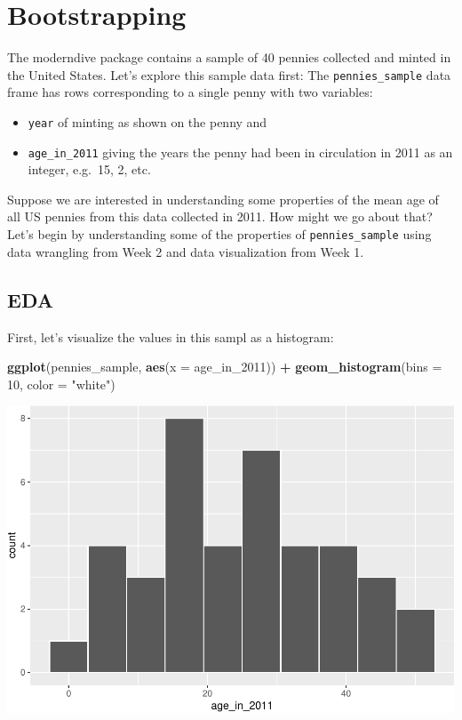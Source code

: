 \documentclass[]{article}
\newenvironment{Shaded}{\begin{snugshade}}{\end{snugshade}}
\newcommand{\KeywordTok}[1]{\textcolor[rgb]{0.13,0.29,0.53}{\textbf{#1}}}
\newcommand{\DataTypeTok}[1]{\textcolor[rgb]{0.13,0.29,0.53}{#1}}
\newcommand{\DecValTok}[1]{\textcolor[rgb]{0.00,0.00,0.81}{#1}}
\newcommand{\StringTok}[1]{\textcolor[rgb]{0.31,0.60,0.02}{#1}}
\newcommand{\OperatorTok}[1]{\textcolor[rgb]{0.81,0.36,0.00}{\textbf{#1}}}
\newcommand{\NormalTok}[1]{#1}
\providecommand{\tightlist}{%
  \setlength{\itemsep}{0pt}\setlength{\parskip}{0pt}}
\begin{document}
\section{Bootstrapping}\label{sec:Bootstrapping}

The moderndive package contains a sample of 40 pennies collected and
minted in the United States. Let's explore this sample data first: The
\texttt{pennies\_sample} data frame has rows corresponding to a single
penny with two variables:

\begin{itemize}
\tightlist
\item
  \texttt{year} of minting as shown on the penny and
\item
  \texttt{age\_in\_2011} giving the years the penny had been in
  circulation in 2011 as an integer, e.g.~15, 2, etc.
\end{itemize}

Suppose we are interested in understanding some properties of the mean
age of all US pennies from this data collected in 2011. How might we go
about that? Let's begin by understanding some of the properties of
\texttt{pennies\_sample} using data wrangling from Week 2 and data
visualization from Week 1.

\subsection{EDA}\label{eda}

First, let's visualize the values in this sampl as a histogram:

\begin{Shaded}
\begin{Highlighting}[]
\KeywordTok{ggplot}\NormalTok{(pennies_sample, }\KeywordTok{aes}\NormalTok{(}\DataTypeTok{x =}\NormalTok{ age_in_}\DecValTok{2011}\NormalTok{)) }\OperatorTok{+}
\StringTok{  }\KeywordTok{geom_histogram}\NormalTok{(}\DataTypeTok{bins =} \DecValTok{10}\NormalTok{, }\DataTypeTok{color =} \StringTok{"white"}\NormalTok{) }
\end{Highlighting}
\end{Shaded}

\includegraphics{DAWeek7_files/figure-latex/summary-1.pdf}
\end{document}
